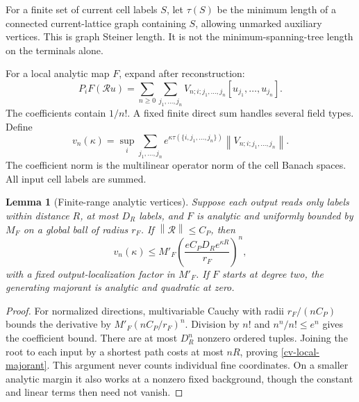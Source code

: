 \documentclass[11pt]{article}
\newtheorem{lemma}[theorem]{Lemma}
\theoremstyle{remark}
\newcommand{\norm}[1]{\left\|#1\right\|}
\begin{document}
For a finite set of current cell labels $S$, let $\tau(S)$ be
the minimum length of a connected current-lattice graph
containing $S$, allowing unmarked auxiliary vertices. This is
graph Steiner length. It is not the minimum-spanning-tree
length on the terminals alone.

For a local analytic map $F$, expand after reconstruction:
\begin{equation}\label{cv-vertex-expansion}
 P_iF(\mathscr Ru)=
 \sum_{n\ge0}\sum_{j_1,\ldots,j_n}
 V_{n;i;j_1,\ldots,j_n}[u_{j_1},\ldots,u_{j_n}].
\end{equation}
The coefficients contain $1/n!$. A fixed finite direct sum
handles several field types. Define
\begin{equation}\label{cv-vertex-norm}
 v_n(\kappa)=\sup_i\sum_{j_1,\ldots,j_n}
 e^{\kappa\tau(\{i,j_1,\ldots,j_n\})}
             \norm{V_{n;i;j_1,\ldots,j_n}}.
\end{equation}
The coefficient norm is the multilinear operator norm of
the cell Banach spaces. All input cell labels are summed.

\begin{lemma}[Finite-range analytic vertices]\label{cv-local-lemma}
Suppose each output reads only labels within distance $R$,
at most $D_R$ labels, and $F$ is analytic and uniformly
bounded by $M_F$ on a global ball of radius $r_F$. If
$\norm{\mathscr R}\le C_P$, then
\begin{equation}\label{cv-local-majorant}
 v_n(\kappa)\le M'_F
       \left(\frac{eC_PD_Re^{\kappa R}}{r_F}\right)^n,
\end{equation}
with a fixed output-localization factor in $M'_F$.
If $F$ starts at degree two, the generating majorant is
analytic and quadratic at zero.
\end{lemma}

\begin{proof}
For normalized directions, multivariable Cauchy with radii
$r_F/(nC_P)$ bounds the derivative by
$M'_F(nC_P/r_F)^n$. Division by $n!$ and
$n^n/n!\le e^n$ gives the coefficient bound. There are at
most $D_R^n$ nonzero ordered tuples. Joining the root to
each input by a shortest path costs at most $nR$, proving
\eqref{cv-local-majorant}. This argument never counts
individual fine coordinates. On a smaller analytic margin
it also works at a nonzero fixed background, though the
constant and linear terms then need not vanish.
\end{proof}
\end{document}
